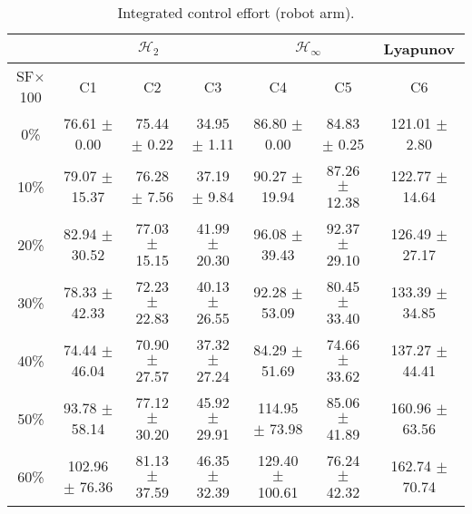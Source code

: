 \begin{table}[H]
\centering
\scriptsize
\begin{tabular}{| c || c | c | c | c | c | c |}
	\hline
	 & \multicolumn{3}{c|}{$\mathcal{H}_{2}$} & \multicolumn{2}{c|}{$\mathcal{H}_{\infty}$} & Lyapunov\\
	\hline
	SF$\times$100 & C1& C2 & C3 & C4 & C5 & C6\\
	\hline\hline
	0\% & 76.61 $\pm$ 0.00 & 75.44 $\pm$ 0.22 & 34.95 $\pm$ 1.11 & 86.80 $\pm$ 0.00 & 84.83 $\pm$ 0.25 & 121.01 $\pm$ 2.80\\
	\hline
	10\% & 79.07 $\pm$ 15.37 & 76.28 $\pm$ 7.56 & 37.19 $\pm$ 9.84 & 90.27 $\pm$ 19.94 & 87.26 $\pm$ 12.38 & 122.77 $\pm$ 14.64\\
	\hline
	20\% & 82.94 $\pm$ 30.52 & 77.03 $\pm$ 15.15 & 41.99 $\pm$ 20.30 & 96.08 $\pm$ 39.43 & 92.37 $\pm$ 29.10 & 126.49 $\pm$ 27.17\\
	\hline
	30\% & 78.33 $\pm$ 42.33 & 72.23 $\pm$ 22.83 & 40.13 $\pm$ 26.55 & 92.28 $\pm$ 53.09 & 80.45 $\pm$ 33.40 & 133.39 $\pm$ 34.85\\
	\hline
	40\% & 74.44 $\pm$ 46.04 & 70.90 $\pm$ 27.57 & 37.32 $\pm$ 27.24 & 84.29 $\pm$ 51.69 & 74.66 $\pm$ 33.62 & 137.27 $\pm$ 44.41\\
	\hline
	50\% & 93.78 $\pm$ 58.14 & 77.12 $\pm$ 30.20 & 45.92 $\pm$ 29.91 & 114.95 $\pm$ 73.98 & 85.06 $\pm$ 41.89 & 160.96 $\pm$ 63.56\\
	\hline
	60\% & 102.96 $\pm$ 76.36 & 81.13 $\pm$ 37.59 & 46.35 $\pm$ 32.39 & 129.40 $\pm$ 100.61 & 76.24 $\pm$ 42.32 & 162.74 $\pm$ 70.74\\
	\hline
\end{tabular}
\caption{Integrated control effort (robot arm).}
\label{table:control_effort_robot_arm:unc}
\end{table}

